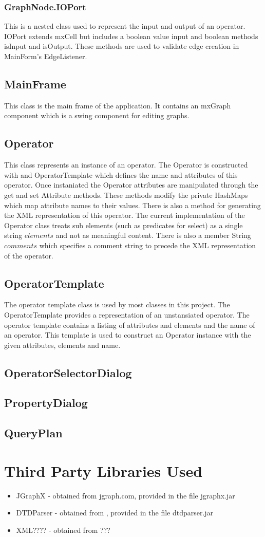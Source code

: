 \documentclass{article}
\begin{document}
\subsubsection{GraphNode.IOPort} This is a nested class used to represent the input and output of an operator.  IOPort extends mxCell but includes a boolean value input and boolean methods isInput and isOutput.  These methods are used to validate edge creation in MainForm's EdgeListener.
\subsection{MainFrame} This class is the main frame of the application.  It contains an mxGraph component which is a swing component for editing graphs.
\subsection{Operator} This class represents an instance of an operator.  The Operator is constructed with and OperatorTemplate which defines the name and attributes of this operator.  Once instaniated the Operator attributes are manipulated through the get and set Attribute methods.  These methods modify the private HashMaps which map attribute names to their values.  There is also a method for generating the XML representation of this operator.  The current implementation of the Operator class treats sub elements (such as predicates for select) as a single string $elements$ and not as meaningful content.  There is also a member String $comments$ which specifies a comment string to precede the XML representation of the operator.
\subsection{OperatorTemplate}  The operator template class is used by most classes in this project.  The OperatorTemplate provides a representation of an unstansiated operator.  The operator template contains a listing of attributes and elements and the name of an operator.  This template is used to construct an Operator instance with the given attributes, elements and name.
\subsection{OperatorSelectorDialog}
\subsection{PropertyDialog}
\subsection{QueryPlan}
\section{Third Party Libraries Used}
\begin{itemize}
\item JGraphX - obtained from jgraph.com, provided in the file jgraphx.jar
\item DTDParser - obtained from  , provided in the file dtdparser.jar
\item XML???? - obtained from ???
\end{itemize}
\end{document}
